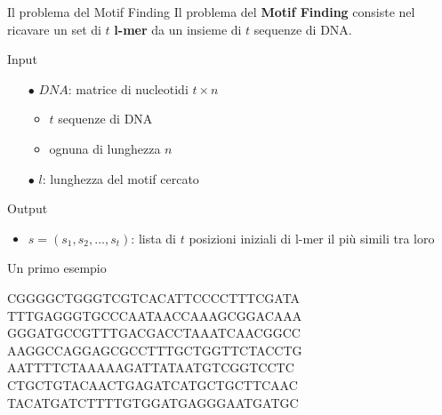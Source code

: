 	\begin{frame}{Il problema del Motif Finding}
		Il problema del \alert{\textbf{Motif Finding}} consiste nel ricavare un set di $t$ \alert{\textbf{l-mer}} da un insieme di $t$ sequenze di DNA.
		\begin{block}{Input}
			\begin{itemize}
				\item[$\bullet$] $DNA$: matrice di nucleotidi $t \times n$
				\begin{itemize}
					\item $t$ sequenze di DNA
					\item ognuna di lunghezza $n$
				\end{itemize}
				\item[$\bullet$] $l$: lunghezza del motif cercato
			\end{itemize}
		\end{block}
		\begin{block}{Output}
			\begin{itemize}
				\item $s=(s_1,s_2,\dots,s_t)$: lista di $t$ posizioni iniziali di l-mer il più simili tra loro
			\end{itemize}
		\end{block}
	\end{frame}
	
	\begin{frame}{Un primo esempio}
		\begin{center}
			CGGGGCTGGGTCGTCACATTCCCCTTTCGATA\\
			TTTGAGGGTGCCCAATAA\spot<2->[fill=yellow]{ATGCAACT}CCAAAGCGGACAAA\\
			GGGATGCCGTTTGACGACCTAAATCAACGGCC\\
			AAGGCCAGGAGCGCCTTTGCTGGTTCTACCTG\\
			AATTTTCTAAAAAGATTATAATGTCGGTCC\spot<2->[fill=yellow]{ATGCAACT}TC\\
			CTGCTGTACAACTGAGATCATGCTGC\spot<2->[fill=yellow]{ATGCAACT}TTCAAC\\
			TACATGATCTTTTGTGGATGAGGGAATGATGC
		\end{center}
	\end{frame}
	
